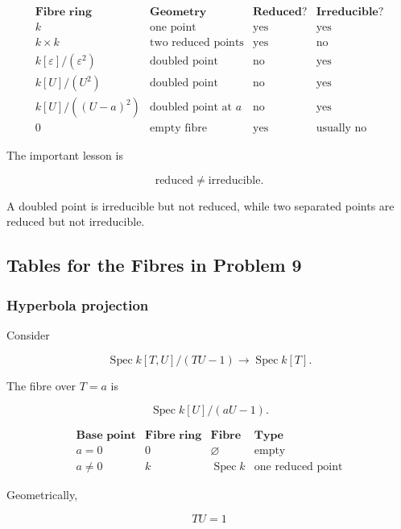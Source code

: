 \documentclass[12pt,a4paper]{article}
\theoremstyle{notespace}
\begin{document}
\[
\begin{array}{c|c|c|c}
	\textbf{Fibre ring} & \textbf{Geometry} & \textbf{Reduced?} & \textbf{Irreducible?} \\
	\hline
	k
	&
	\text{one point}
	&
	\text{yes}
	&
	\text{yes}
	\\
	\hline
	k\times k
	&
	\text{two reduced points}
	&
	\text{yes}
	&
	\text{no}
	\\
	\hline
	k[\varepsilon]/(\varepsilon^2)
	&
	\text{doubled point}
	&
	\text{no}
	&
	\text{yes}
	\\
	\hline
	k[U]/(U^2)
	&
	\text{doubled point}
	&
	\text{no}
	&
	\text{yes}
	\\
	\hline
	k[U]/((U-a)^2)
	&
	\text{doubled point at }a
	&
	\text{no}
	&
	\text{yes}
	\\
	\hline
	0
	&
	\text{empty fibre}
	&
	\text{yes}
	&
	\text{usually no}
\end{array}
\]

The important lesson is

\[
\boxed{
	\text{reduced} \neq \text{irreducible}.
}
\]

A doubled point is irreducible but not reduced, while two separated points are reduced but not irreducible.

\subsection{Tables for the Fibres in Problem 9}

\subsubsection{Hyperbola projection}

Consider

\[
\operatorname{Spec}k[T,U]/(TU-1)
\to
\operatorname{Spec}k[T].
\]

The fibre over \(T=a\) is

\[
\operatorname{Spec}k[U]/(aU-1).
\]

\[
\begin{array}{c|c|c|c}
	\textbf{Base point} & \textbf{Fibre ring} & \textbf{Fibre} & \textbf{Type} \\
	\hline
	a=0
	&
	0
	&
	\varnothing
	&
	\text{empty}
	\\
	\hline
	a\neq 0
	&
	k
	&
	\operatorname{Spec}k
	&
	\text{one reduced point}
\end{array}
\]

Geometrically,

\[
TU=1
\]
\end{document}
